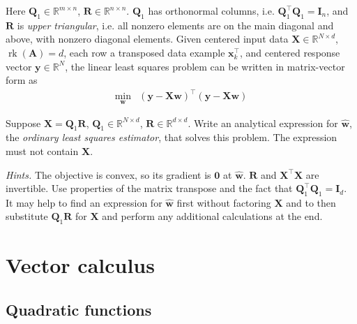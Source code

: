 \documentclass{article}
\numberwithin{equation}{section}
\begin{document}
Here $ \mathbf{Q}_1 \in \mathbb{R}^{m \times n} $, $ \mathbf{R} \in
\mathbb{R}^{n \times n} $. $ \mathbf{Q}_1 $ has orthonormal columns, i.e.
$ \mathbf{Q}_1^\top\mathbf{Q}_1 = \mathbf{I}_n $, and $ \mathbf{R} $ is
\textit{upper triangular}, i.e. all nonzero elements are on the main diagonal
and above, with nonzero diagonal elements. Given centered input data
$ \mathbf{X} \in \mathbb{R}^{N \times d} $,
$ \operatorname{rk}(\mathbf{A}) = d $, each row a transposed data example
$ \mathbf{x}_k^\top $, and centered\footnotemark{} response vector $ \mathbf{y} \in \mathbb{R}^N $, the linear least squares
problem can be written in matrix-vector form as
\begin{equation*}
    \begin{array}{ll}
        \displaystyle\min_\mathbf{w} &
        (\mathbf{y} - \mathbf{Xw})^\top(\mathbf{y} - \mathbf{Xw})
    \end{array}
\end{equation*}

Suppose $ \mathbf{X} = \mathbf{Q}_1\mathbf{R} $, $ \mathbf{Q}_1 \in
\mathbb{R}^{N \times d} $, $ \mathbf{R} \in \mathbb{R}^{d \times d} $. Write
an analytical expression for $ \hat{\mathbf{w}} $, the \textit{ordinary least
squares estimator}, that solves this problem. The expression must not contain
$ \mathbf{X} $.

\medskip

\textit{Hints.} The objective is convex, so its gradient is $ \mathbf{0} $ at
$ \hat{\mathbf{w}} $. $ \mathbf{R} $ and $ \mathbf{X}^\top\mathbf{X} $ are
invertible. Use properties of the matrix transpose and the fact that
$ \mathbf{Q}_1^\top\mathbf{Q}_1 = \mathbf{I}_d $. It may help to find an
expression for $ \hat{\mathbf{w}} $ first without factoring $ \mathbf{X} $
and to then substitute $ \mathbf{Q}_1\mathbf{R} $ for $ \mathbf{X} $ and
perform any additional calculations at the end.

\section{Vector calculus}

\subsection{Quadratic functions}
\end{document}
